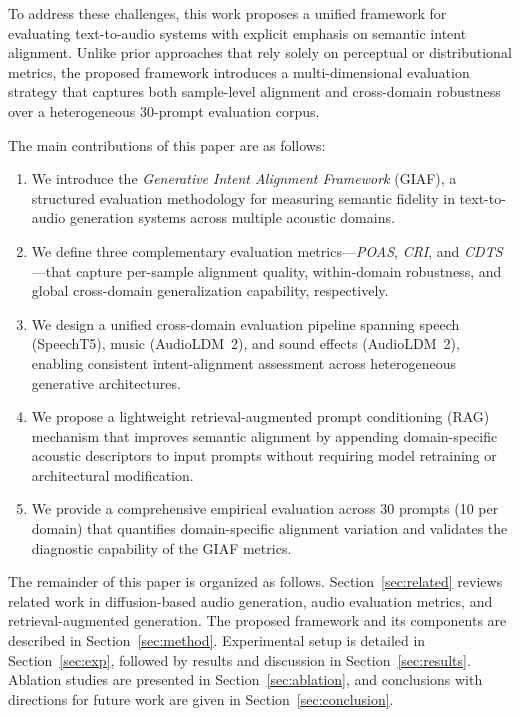 \documentclass[journal]{IEEEtran}
\begin{document}
To address these challenges, this work proposes a unified framework
for evaluating text-to-audio systems with explicit emphasis on
semantic intent alignment. Unlike prior approaches that rely solely on
perceptual or distributional metrics, the proposed framework introduces
a multi-dimensional evaluation strategy that captures both
sample-level alignment and cross-domain robustness over a
heterogeneous 30-prompt evaluation corpus.

The main contributions of this paper are as follows:
\begin{enumerate}[leftmargin=*]
\item We introduce the \textit{Generative Intent Alignment Framework}
(GIAF), a structured evaluation methodology for measuring semantic
fidelity in text-to-audio generation systems across multiple acoustic
domains.

\item We define three complementary evaluation metrics---\textit{POAS},
\textit{CRI}, and \textit{CDTS}---that capture per-sample alignment
quality, within-domain robustness, and global cross-domain
generalization capability, respectively.

\item We design a unified cross-domain evaluation pipeline spanning
speech (SpeechT5), music (AudioLDM~2), and sound effects (AudioLDM~2),
enabling consistent intent-alignment assessment across heterogeneous
generative architectures.

\item We propose a lightweight retrieval-augmented prompt conditioning
(RAG) mechanism that improves semantic alignment by appending
domain-specific acoustic descriptors to input prompts without requiring
model retraining or architectural modification.

\item We provide a comprehensive empirical evaluation across 30 prompts
(10 per domain) that quantifies domain-specific alignment variation
and validates the diagnostic capability of the GIAF metrics.
\end{enumerate}

The remainder of this paper is organized as follows. Section~\ref{sec:related}
reviews related work in diffusion-based audio generation, audio
evaluation metrics, and retrieval-augmented generation. The proposed
framework and its components are described in Section~\ref{sec:method}.
Experimental setup is detailed in Section~\ref{sec:exp}, followed by
results and discussion in Section~\ref{sec:results}. Ablation studies
are presented in Section~\ref{sec:ablation}, and conclusions with
directions for future work are given in Section~\ref{sec:conclusion}.
\end{document}
